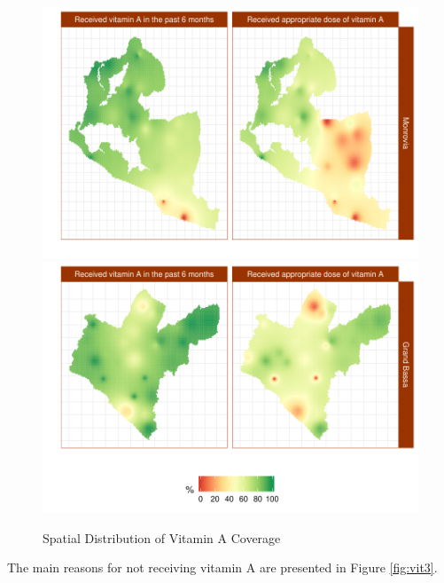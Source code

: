\documentclass[12pt,a4paper]{article}
\begin{document}
\begin{figure}[H]

{\centering \includegraphics{liberiaCoverageReport_files/figure-latex/vitMap-1} \includegraphics{liberiaCoverageReport_files/figure-latex/vitMap-2} 

}

\caption{Spatial Distribution of Vitamin A Coverage}\label{fig:vitMap}
\end{figure}

The main reasons for not receiving vitamin A are presented in Figure \ref{fig:vit3}.
\end{document}
